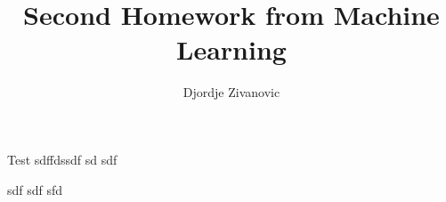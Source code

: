 \documentclass[10pt,a4paper]{article}
\author{Djordje Zivanovic}
\title{Second Homework from Machine Learning}
\begin{document}
Test
sdffdssdf
sd
sdf

sdf
sdf
sfd
\end{document}
